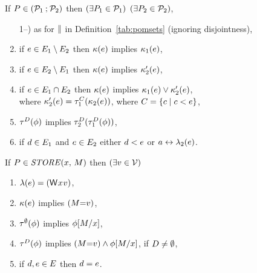 \begin{definition}
  \noindent
  If $\aPS\SB0 \in (\aPSS_1\sSEMI\aPSS_2)$ then
  $(\exists\aPS_1\in\aPSS_1)$ $(\exists\aPS_2\in\aPSS_2)$,
  \begin{enumerate}
  \setcounter{enumi}{\value{pomsetParCount}}
  \item[1--\thepomsetParCount)] as for $\sPAR$  in
    Definition~\ref{tab:pomsets} (ignoring disjointness),
  \item if $\aEv\in\aEvs_1\setminus\aEvs_2$ then $\labelingForm\SB0(\aEv)$ implies $\labelingForm_1(\aEv)$,
  \item if $\aEv\in\aEvs_2\setminus\aEvs_1$ then $\labelingForm\SB0(\aEv)$ implies $\labelingForm'_2(\aEv)$,
  \item if $\aEv\in\aEvs_1\cap\aEvs_2$ then $\labelingForm\SB0(\aEv)$ implies $\labelingForm_1(\aEv)\lor\labelingForm'_2(\aEv)$,
  \\ where $\labelingForm'_2(\aEv)=\aTr[\cEvs]_1(\labelingForm_2(\aEv))$, where $\cEvs=\{ \cEv \mid \cEv <\SB0 \aEv \}$,
  \item $\aTr[\bEvs]\SB0(\aForm)$ implies $\aTr[\bEvs]_2(\aTr[\bEvs]_1(\aForm))$,
  \item if $\bEv\in\aEvs_1$ and $\aEv\in\aEvs_2$ either $\bEv<\SB0\aEv$ or $a\reorder\labeling_2(\aEv)$.
  \end{enumerate}

  \noindent
  If $\aPS\SB0 \in \sSTORE{\aLoc}{\aExp}$ then
  $(\exists\aVal\in\Val)$
  \begin{enumerate}
  \item $\labelingAct\SB0(\aEv) = \DWP{\aLoc}{\aVal}$,
  \item $\labelingForm\SB0(\aEv)$ implies $(\aExp{=}\aVal)$,
  \item %
    $\aTr[\emptyset]\SB0(\aForm)$ implies $\aForm[\aExp/\aLoc]$,
  \item %
    $\aTr[\bEvs]\SB0(\aForm)$ implies $(\aExp{=}\aVal) \land \aForm[\aExp/\aLoc]$, if $\bEvs\neq\emptyset$,
  \item if $\bEv,\aEv\in\aEvs\SB0$ then $\bEv=\aEv$.
  \end{enumerate}


\end{definition}
